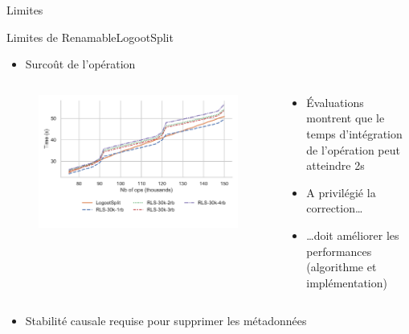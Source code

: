 \begin{frame}[fragile]{Limites}
  \begin{block}{Limites de RenamableLogootSplit}
    \begin{itemize}
      \item Surcoût de l'opération \ren
    \end{itemize}
    \pause
    \begin{columns}
      \begin{column}{0.6\textwidth}
        \begin{figure}[!ht]
            \includegraphics[width=\columnwidth]{img/replay-log-30k-2022-12-09}
        \end{figure}
      \end{column}
      \hspace{-2em}
      \begin{column}{0.6\textwidth}
        \pause
        \begin{itemize}
          \item Évaluations montrent que le \alert{temps d'intégration de l'opération \ren peut atteindre 2s}
          \item A \alert{privilégié la correction}\dots
          \item \dots doit \alert{améliorer les performances} (algorithme et implémentation)
        \end{itemize}
      \end{column}
    \end{columns}
    \pause
    \begin{itemize}
      \item Stabilité causale requise pour supprimer les métadonnées
    \end{itemize}
  \end{block}
\end{frame}

